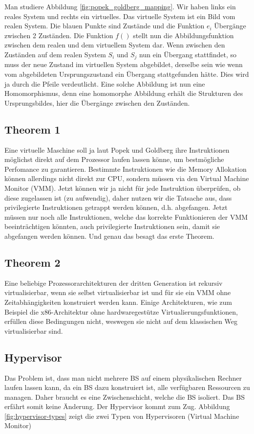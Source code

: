 Man studiere Abbildung \ref{fig:popek_goldberg_mapping}. Wir haben links ein reales System und rechts ein virtuelles. Das virtuelle System ist ein Bild vom realen System. Die blauen Punkte sind Zustände und die Funktion $ e_{i} $ Übergänge zwischen 2 Zuständen. Die Funktion $ f() $ stellt nun die Abbildungsfunktion zwischen dem realen und dem virtuellem System dar. Wenn zwischen den Zuständen auf dem realen System $ S_{i} $ und $ S_{j} $ nun ein Übergang stattfindet, so muss der neue Zustand im virtuellen System abgebildet, derselbe sein wie wenn vom abgebildeten Ursprungszustand ein Übergang stattgefunden hätte. Dies wird ja durch die Pfeile verdeutlicht. Eine solche Abbildung ist nun eine Homomorphismus, denn eine homomorphe Abbildung erhält die Strukturen des Ursprungsbildes, hier die Übergänge zwischen den Zuständen.

\subsection{Theorem 1}
\label{sec:poppek-goldberg-theorem1}
Eine virtuelle Maschine soll ja laut Popek und Goldberg ihre Instruktionen möglichst direkt auf dem Prozessor laufen lassen könne, um bestmögliche Perfomance zu garantieren. Bestimmte Instruktionen wie die Memory Allokation können allerdings nicht direkt zur CPU, sondern müssen via den Virtual Machine Monitor (VMM). Jetzt können wir ja nicht für jede Instruktion überprüfen, ob diese zugelassen ist (zu aufwendig), daher nutzen wir die Tatsache aus, dass privilegierte Instruktionen getrappt werden können, d.h. abgefangen. Jetzt müssen nur noch alle Instruktionen, welche das korrekte Funktionieren der VMM beeinträchtigen könnten, auch privilegierte Instruktionen sein, damit sie abgefangen werden können. Und genau das besagt das erste Theorem.

\subsection{Theorem 2}
Eine beliebige Prozessorarchitekturen der dritten Generation ist rekursiv virtualisierbar, wenn sie selbst virtualisierbar ist und für sie ein VMM ohne Zeitabhängigkeiten konstruiert werden kann.
Einige Architekturen, wie zum Beispiel die x86-Architektur ohne hardwaregestütze Virtualierungsfunktionen, erfüllen diese Bedingungen nicht, weswegen sie nicht auf dem klassischen Weg virtualisierbar sind.

\subsection{Hypervisor}
Das Problem ist, dass man nicht mehrere BS auf einem physikalischen Rechner laufen lassen kann, da ein BS dazu konstruiert ist, alle verfügbaren Ressourcen zu managen. Daher braucht es eine Zwischenschicht, welche die BS isoliert. Das BS erfährt somit keine Änderung. Der Hypervisor kommt zum Zug. Abbildung \ref{fig:hypervisor-types} zeigt die zwei Typen von Hypervisoren (Virtual Machine Monitor)

